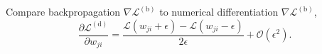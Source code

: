 \documentclass[mathserif,10pt]{beamer}
\begin{document}
\begin{frame}
  Compare backpropagation $\nabla \mathcal{L}^{(\text{b})}$ to numerical differentiation $\nabla \mathcal{L}^{(\text{b})}$,
  \begin{equation}
    \dfrac{\partial \mathcal{L}^{(\text{d})}}{\partial w_{ji}} = \dfrac{\mathcal{L}(w_{ji} + \epsilon) - \mathcal{L}(w_{ji} - \epsilon)}{2\epsilon} + \mathcal{O}(\epsilon^2).
  \end{equation}
\end{frame}
\end{document}
